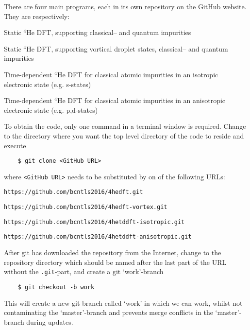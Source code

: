 \documentclass[10pt,a4paper]{article}
\begin{document}
	There are four main programs, each in its own repository on the GitHub website. They are respectively:
	\begin{description}[align=right,labelwidth=0.50cm]
		\item [1. ] Static $^4$He DFT, supporting classical-- and quantum impurities
		\item[2. ] Static $^4$He DFT, supporting vortical droplet states, classical-- and quantum impurities 
		\item[3. ] Time-dependent $^4$He DFT for classical atomic impurities in an isotropic electronic state (e.g. s-states)
		\item[4. ] Time-dependent $^4$He DFT for classical atomic impurities in an anisotropic electronic state (e.g. p,d-states)
	\end{description}
	To obtain the code, only one command in a terminal window is required. Change to the directory where you want the top level directory of the code to reside and execute
	\begin{verbatim}
	$ git clone <GitHub URL>
	\end{verbatim}
	where \verb|<GitHub URL>| needs to be substituted by on of the following URLs:
	\begin{description}[align=right,labelwidth=0.5cm]
		\item[1. ] \verb|https://github.com/bcntls2016/4hedft.git|
		\item[2. ] \verb|https://github.com/bcntls2016/4hedft-vortex.git|
		\item[3. ] \verb|https://github.com/bcntls2016/4hetddft-isotropic.git|
		\item[4. ] \verb|https://github.com/bcntls2016/4hetddft-anisotropic.git|
	\end{description}
	
	After git has downloaded the repository from the Internet, change to the repository directory which should be named after the last part of the URL without the \verb|.git|-part, and create a git `work'-branch
	\begin{verbatim}
	$ git checkout -b work
	\end{verbatim}
	This will create a new git branch called `work' in which we can work, whilst not contaminating the `master'-branch and prevents merge conflicts in the `master'-branch during updates.
	
\end{document}
